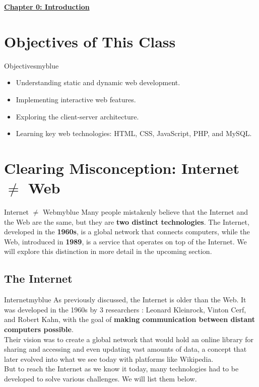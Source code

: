 \begin{center}
    \Huge{\textbf{\underline{Chapter 0: Introduction}}}
\end{center}

\setcounter{section}{0}

\vspace{0.35cm}

\section{Objectives of This Class}  
\begin{prettyBox}{Objectives}{myblue}  
\begin{itemize}  
    \item Understanding static and dynamic web development.  
    \item Implementing interactive web features.  
    \item Exploring the client-server architecture.  
    \item Learning key web technologies: HTML, CSS, JavaScript, PHP, and MySQL.  
\end{itemize}  
\end{prettyBox}  

\vspace{0.35cm}

\section{Clearing Misconception: Internet \(\neq\) Web}  
\begin{prettyBox}{Internet \(\neq\) Web}{myblue}  
Many people mistakenly believe that the Internet and the Web are the same, 
but they are \textbf{two distinct technologies}. The Internet, developed in the \textbf{1960s},
is a global network that connects computers, while the Web, introduced in \textbf{1989},
is a service that operates on top of the Internet. We will explore this
distinction in more detail in the upcoming section.  
\end{prettyBox}  

\vspace{0.35cm}
\subsection{The Internet}


\begin{prettyBox}{Internet}{myblue}  
As previously discussed, the Internet is older than the Web. It was developed
in the 1960s by  3 researchers : Leonard Kleinrock, Vinton Cerf, and Robert Kahn,
with the goal of \textbf{making communication between distant computers possible}.\\[0.15cm]
Their vision was to create a global network that would hold an online library
for sharing and accessing and even updating vast amounts of data,
a concept that later evolved into what we see today with platforms like Wikipedia.\\[0.15cm]
But to reach the Internet as we know it today, many technologies had to be 
developed to solve various challenges. We will list them below.
\end{prettyBox}  

